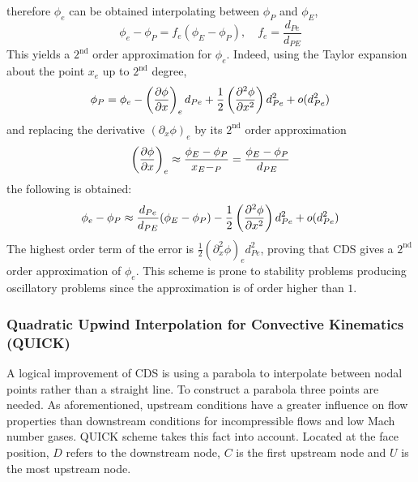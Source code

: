 \noindent
therefore $\phi_e$ can be obtained interpolating between $\phi_P$ and $\phi_E$,
\begin{equation}
	\phi_e - \phi_P = f_e \left( \phi_E - \phi_P \right), \quad f_e = \frac{d_{Pe}}{d_{PE}}
\end{equation}
This yields a $2^{\text{nd}}$ order approximation for $\phi_e$. Indeed, using the Taylor expansion about the point $x_e$ up to $2^\text{nd}$ degree,
\begin{equation}
	\phi_P = 
	\phi_e - \left(\pdv{\phi}{x}\right)_e d_{Pe} + \frac{1}{2} \left(\pdv[2]{\phi}{x}\right) d_{Pe}^2 + o(d_{Pe}^2)
\end{equation}
and replacing the derivative $(\partial_x \phi)_e$ by its $2^\text{nd}$ order approximation
\begin{equation}
	\left(\pdv{\phi}{x}\right)_e \approx 
	\frac{\phi_E - \phi_P}{x_E - _P} =  
	\frac{\phi_E - \phi_P}{d_{PE}}
\end{equation}
the following is obtained:
\begin{equation}
	\phi_e - \phi_P \approx 
	\frac{d_{Pe}}{d_{PE}} (\phi_E - \phi_P) - \frac{1}{2} \left(\pdv[2]{\phi}{x}\right) d_{Pe}^2 + o(d_{Pe}^2)
\end{equation}
The highest order term of the error is $\frac{1}{2} (\partial_x^2 \phi)_e d_{Pe}^2$, proving that CDS gives a $2^\text{nd}$ order approximation of $\phi_e$. This scheme is prone to stability problems producing oscillatory problems since the approximation is of order higher than $1$.

\subsubsection{Quadratic Upwind Interpolation for Convective Kinematics (QUICK)}

A logical improvement of CDS is using a parabola to interpolate between nodal points rather than a straight line. To construct a parabola three points are needed. As aforementioned, upstream conditions have a greater influence on flow properties than downstream conditions for incompressible flows and low Mach number gases. QUICK scheme takes this fact into account. Located at the face position, $D$ refers to the downstream node, $C$ is the first upstream node and $U$ is the most upstream node.


